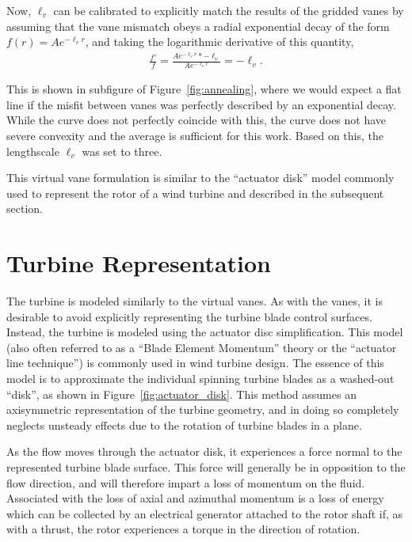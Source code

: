Now, $\ell_v$ can be calibrated to explicitly match the results of the
gridded vanes by assuming that the vane mismatch obeys a radial
exponential decay of the form $f(r) = A e^{-\ell_v r}$, and taking the
logarithmic derivative of this quantity, 
\begin{eqnarray}
 \frac{f'}{f} = \frac{A e^{-\ell_v r} * -\ell_v}{A e^{-\ell_v r}} =
  -\ell_v. 
\end{eqnarray}

This is shown in subfigure of Figure~\ref{fig:annealing}, where we would
expect a flat line if the misfit between vanes was perfectly described
by an exponential decay. While the curve does not perfectly coincide
with this, the curve does not have severe convexity and the average is
sufficient for this work. Based on this, the lengthscale $\ell_v$ was
set to three. 


This virtual vane formulation is similar to the ``actuator disk'' model
commonly used to represent the rotor of a wind turbine and
described in the subsequent section. 

\section{Turbine Representation}
\label{sec:actuator_disk}
%
%

The turbine is modeled similarly to the virtual vanes. As with the
vanes, it is desirable to avoid explicitly representing the turbine
blade control surfaces. Instead, the turbine is modeled using the
actuator disc simplification. 
This model (also often referred to as a ``Blade Element Momentum''
theory or the ``actuator line technique'') is commonly used in wind
turbine design\cite{shevell1983fundamentals,betz,leclerc}. The essence
of this model is to approximate the individual spinning turbine blades
as a washed-out ``disk'', as shown in Figure~\ref{fig:actuator_disk}.
This method assumes an axisymmetric representation of the turbine
geometry, and in doing so completely neglects unsteady effects due to
the rotation of turbine blades in a plane. 

As the flow moves through the actuator disk, it experiences a force
normal to the represented turbine blade surface. This force will
generally be in opposition to the flow direction, and will therefore
impart a loss of momentum on the fluid. 
Associated with the loss of axial and azimuthal momentum is a loss of
energy which can be collected by an electrical generator attached
to the rotor shaft if, as with a thrust, the rotor experiences a torque
in the direction of rotation. 

